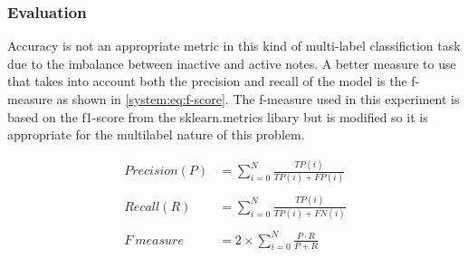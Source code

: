 \subsubsection{Evaluation}
Accuracy is not an appropriate metric in this kind of multi-label classifiction task due to the
imbalance between inactive and active notes. A better measure to use that takes into account both the
precision and recall of the model is the f-measure as shown in \autoref{system:eq:f-score}. The f-measure used in this experiment is based on the
f1-score from the sklearn.metrics libary but is modified so it is appropriate for the
multilabel nature of this problem.

\begin{equation}
    \begin{aligned}
        Precision(P) & = \sum_{i=0}^{N}\frac{TP(i)}{TP(i) + FP(i)}   \\ \\
        Recall(R)    & = \sum_{i=0}^{N}\frac{TP(i)}{TP(i) + FN(i)}   \\ \\
        F~measure    & = 2 \times \sum_{i=0}^{N}\frac{P\cdot R}{P+R} \\
    \end{aligned}
    \label{system:eq:f-score}
\end{equation}